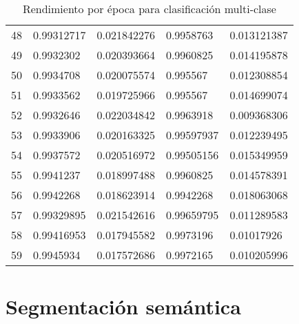 \begin{table}[H]
{\begin{tabular}{@{}lllll@{}}
    48 & 0.99312717 & 0.021842276 & 0.9958763 & 0.013121387 \\
    49 & 0.9932302 & 0.020393664 & 0.9960825 & 0.014195878 \\
    50 & 0.9934708 & 0.020075574 & 0.995567 & 0.012308854 \\
    51 & 0.9933562 & 0.019725966 & 0.995567 & 0.014699074 \\
    52 & 0.9932646 & 0.022034842 & 0.9963918 & 0.009368306 \\
    53 & 0.9933906 & 0.020163325 & 0.99597937 & 0.012239495 \\
    54 & 0.9937572 & 0.020516972 & 0.99505156 & 0.015349959 \\
    55 & 0.9941237 & 0.018997488 & 0.9960825 & 0.014578391 \\
    56 & 0.9942268 & 0.018623914 & 0.9942268 & 0.018063068 \\
    57 & 0.99329895 & 0.021542616 & 0.99659795 & 0.011289583 \\
    58 & 0.99416953 & 0.017945582 & 0.9973196 & 0.01017926 \\
    59 & 0.9945934 & 0.017572686 & 0.9972165 & 0.010205996 \\ \bottomrule
    \end{tabular}%
    }
    \caption{Rendimiento por época para clasificación multi-clase}\label{tabla:rendimiento_7}
    \end{table}

    \section{Segmentación semántica}

